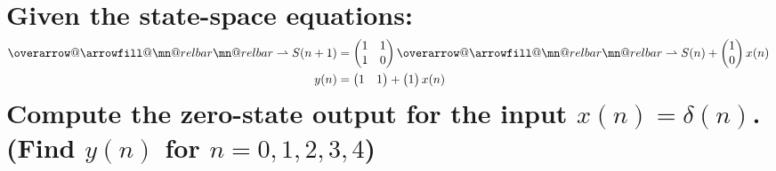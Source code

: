 \documentclass{article}
\makeatletter
\DeclareRobustCommand{\overrightharpoon}{\mathpalette{\overarrow@\rightharpoonfill@}}
\def\rightharpoonfill@{\arrowfill@\mn@relbar\mn@relbar\rightharpoonup}
\makeatother
\begin{document}
\section[Question ~\thesection]{Given the state-space equations: \begin{align*} \overrightharpoon{S(n + 1)} &= \begin{pmatrix} 1 & 1 \\ 1 & 0 \end{pmatrix}\overrightharpoon{S(n)} + \begin{pmatrix} 1 \\ 0 \end{pmatrix}x(n) \\ y(n) &= \begin{pmatrix} 1 & 1 \end{pmatrix} + \begin{pmatrix} 1 \end{pmatrix}x(n) \end{align*} Compute the zero-state output for the input $x(n) = \delta(n)$. (Find $y(n)$ for $n = 0, 1, 2, 3, 4$)}
\end{document}
